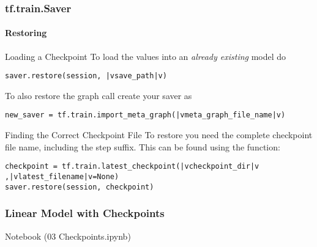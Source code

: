 \begin{frame}[fragile]
    \frametitle{tf.train.Saver}
    \framesubtitle{Restoring}
    \begin{block}{Loading a Checkpoint}
    To load the values into an \emph{already existing} model do
\begin{lstlisting}
saver.restore(session, |vsave_path|v)
\end{lstlisting}
To also restore the graph call create your saver as
\begin{lstlisting}
new_saver = tf.train.import_meta_graph(|vmeta_graph_file_name|v)
\end{lstlisting}
    \end{block}

    \begin{block}{Finding the Correct Checkpoint File}
        To restore you need the complete checkpoint file name, including the step suffix.
        This can be found using the  function:
    \begin{lstlisting}
checkpoint = tf.train.latest_checkpoint(|vcheckpoint_dir|v ,|vlatest_filename|v=None)
saver.restore(session, checkpoint)
    \end{lstlisting}
    \end{block}
\end{frame}

\begin{frame}[fragile]
    \frametitle{Linear Model with Checkpoints}
    \centering Notebook (03 Checkpoints.ipynb)
\end{frame}
